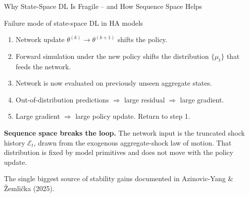 \documentclass[aspectratio=169,11pt]{beamer}
\newcommand{\emphc}[1]{\textcolor{harvardcrimson}{#1}}
\newcommand{\histE}{\mathcal{E}}  %
\begin{document}
\begin{frame}[shrink=10]{Why State-Space DL Is Fragile -- and How Sequence Space Helps}
\small
\begin{alertblock}{Failure mode of state-space DL in HA models}
\begin{enumerate}\itemsep1pt
    \item Network update $\theta^{(k)} \to \theta^{(k+1)}$ shifts the policy.
    \item Forward simulation under the new policy shifts the distribution $\{\mu_t\}$ that feeds the network.
    \item Network is now evaluated on \emphc{previously unseen} aggregate states.
    \item Out-of-distribution predictions $\Rightarrow$ large residual $\Rightarrow$ large gradient.
    \item Large gradient $\Rightarrow$ large policy update.  \emphc{Return to step 1.}
\end{enumerate}
\end{alertblock}

\vspace{0.4em}
\textbf{Sequence space breaks the loop.}  The network input is the truncated shock history $\histE_t$, drawn from the \emphc{exogenous} aggregate-shock law of motion.  That distribution is fixed by model primitives and \emphc{does not move} with the policy update.

\vspace{0.4em}
{\footnotesize The single biggest source of stability gains documented in Azinovic-Yang \& \v{Z}emli\v{c}ka (2025).}
\end{frame}


\end{document}
